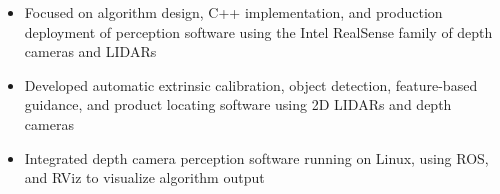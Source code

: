 	\begin{itemize} [leftmargin = \itemmargin]
				
		\item Focused on algorithm design, C++ implementation, and production deployment of perception software using the Intel RealSense family of depth cameras and LIDARs

		\item Developed automatic extrinsic calibration, object detection, feature-based guidance, and product locating software using 2D LIDARs and depth cameras

		\item Integrated depth camera perception software running on Linux, using ROS, and RViz to visualize algorithm output
		
	\end{itemize} \\